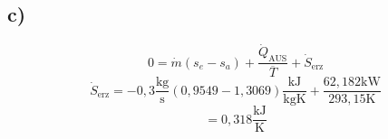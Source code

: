 

\subsection*{c)}
\[
0 = \dot{m} (s_e - s_a) + \frac{\dot{Q}_{\text{AUS}}}{\overline{T}} + \dot{S}_{\text{erz}}
\]
\[
\dot{S}_{\text{erz}} = -0,3 \frac{\text{kg}}{\text{s}} \left(0,9549 - 1,3069 \right) \frac{\text{kJ}}{\text{kgK}} + \frac{62,182 \text{kW}}{293,15 \text{K}}
\]
\[
= 0,318 \frac{\text{kJ}}{\text{K}}
\]